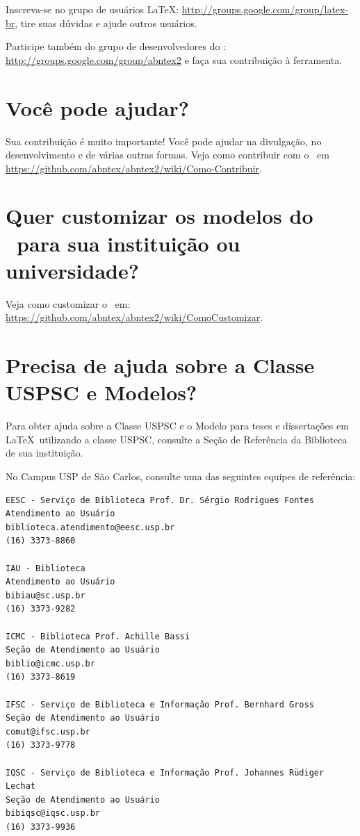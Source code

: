 Inscreva-se no grupo de usuários \LaTeX:
\url{http://groups.google.com/group/latex-br}, tire suas dúvidas e ajude
outros usuários.

Participe também do grupo de desenvolvedores do \textsf{\abnTeX}:
\url{http://groups.google.com/group/abntex2} e faça sua contribuição à
ferramenta.

\section{Você pode ajudar?}

Sua contribuição é muito importante! Você pode ajudar na divulgação, no
desenvolvimento e de várias outras formas. Veja como contribuir com o \abnTeX\
em \url{https://github.com/abntex/abntex2/wiki/Como-Contribuir}.

\section{Quer customizar os modelos do \abnTeX\ para sua instituição ou
universidade?}

Veja como customizar o \abnTeX\ em:
\url{https://github.com/abntex/abntex2/wiki/ComoCustomizar}.

\section{Precisa de ajuda sobre a Classe USPSC e Modelos?}
Para obter ajuda sobre a Classe USPSC e o Modelo para teses e dissertações em \LaTeX\  utilizando a classe USPSC, consulte a Seção de Referência da Biblioteca de sua instituição.

No Campus USP de São Carlos, consulte uma das seguintes equipes de referência:
\begin{verbatim}
EESC - Serviço de Biblioteca Prof. Dr. Sérgio Rodrigues Fontes 
Atendimento ao Usuário
biblioteca.atendimento@eesc.usp.br
(16) 3373-8860

IAU - Biblioteca
Atendimento ao Usuário
bibiau@sc.usp.br
(16) 3373-9282

ICMC - Biblioteca Prof. Achille Bassi
Seção de Atendimento ao Usuário
biblio@icmc.usp.br
(16) 3373-8619

IFSC - Serviço de Biblioteca e Informação Prof. Bernhard Gross
Seção de Atendimento ao Usuário
comut@ifsc.usp.br
(16) 3373-9778

IQSC - Serviço de Biblioteca e Informação Prof. Johannes Rüdiger Lechat
Seção de Atendimento ao Usuário
bibiqsc@iqsc.usp.br
(16) 3373-9936
\end{verbatim}


